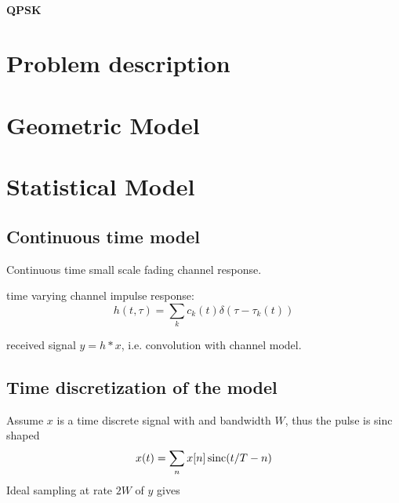 \paragraph{QPSK}

\section{Problem description}

\section{Geometric Model}

\section{Statistical Model}


\subsection{Continuous time model}

Continuous time small scale fading channel response.

time varying channel impulse response:
\begin{equation}
	h(t, \tau) = \sum_k c_k (t) \delta(\tau - \tau_k(t))
\end{equation}

received signal \(y = h * x\), i.e. convolution with channel model.

\subsection{Time discretization of the model}


Assume \(x\) is a time discrete signal with and bandwidth \(W\), thus the pulse is sinc shaped
\begin{equation}
	x(t) = \sum_n x[n] \operatorname{sinc}(t/T - n)
\end{equation}
Ideal sampling at rate \(2W\) of \(y\) gives
